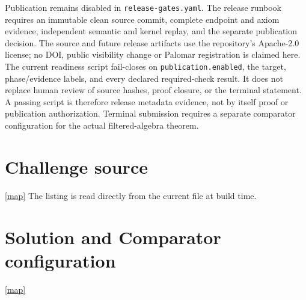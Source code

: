 \documentclass[10pt,a4paper]{article}
\newcommand{\backmap}{\hfill\hyperlink{proofmap}{[map]}}
\newcommand{\lean}[1]{\nolinkurl{#1}}
\begin{document}
Publication remains disabled in \lean{release-gates.yaml}. The release
runbook requires an immutable clean source commit, complete endpoint and
axiom evidence, independent semantic and kernel replay, and the separate
publication decision. The source and future release artifacts use the
repository's Apache-2.0 license; no DOI, public visibility change or Palomar
registration is claimed here.
The current readiness script fail-closes on \lean{publication.enabled}, the
target, phase/evidence labels, and every declared required-check result. It
does not replace human review of source hashes, proof closure, or the terminal
statement. A passing script is therefore release metadata evidence, not by
itself proof or publication authorization. Terminal submission requires a
separate comparator configuration for the actual filtered-algebra theorem.



\appendix
\clearpage
\section{Challenge source}\label{sec:challenge}\backmap
The listing is read directly from the current file at build time.

\section{Solution and Comparator configuration}\label{sec:solution}\backmap
{}
\end{document}
